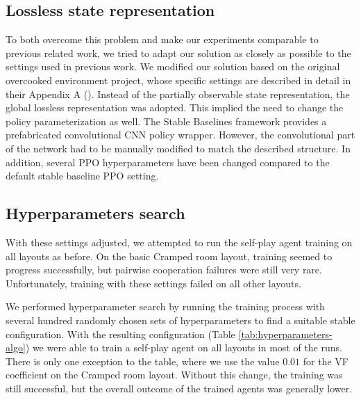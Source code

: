 \subsection*{Lossless state representation}
To both overcome this problem and make our experiments comparable to previous related work, we tried to adapt our solution as closely as possible to the settings used in previous work.
We modified our solution based on the original overcooked environment project, whose specific settings are described in detail in their Appendix A (\cite{carroll2020utility}).
Instead of the partially observable state representation, the global lossless representation was adopted.
This implied the need to change the policy parameterization as well.
The Stable Baselines framework provides a prefabricated convolutional CNN policy wrapper.
However, the convolutional part of the network had to be manually modified to match the described structure.
In addition, several PPO hyperparameters have been changed compared to the default stable baseline PPO setting.


\subsection*{Hyperparameters search}
With these settings adjusted, we attempted to run the self-play agent training on all layouts as before.
On the basic Cramped room layout, training seemed to progress successfully, but pairwise cooperation failures were still very rare.
Unfortunately, training with these settings failed on all other layouts.

We performed hyperparameter search by running the training process with several hundred randomly chosen sets of hyperparameters to find a suitable stable configuration.
With the resulting configuration (Table \ref{tab:hyperparameters-algo}) we were able to train a self-play agent on all layouts in most of the runs.
There is only one exception to the table, where we use the value $0.01$ for the VF coefficient on the Cramped room layout.
Without this change, the training was still successful, but the overall outcome of the trained agents was generally lower.


